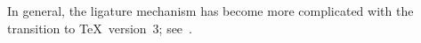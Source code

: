 In general, the ligature mechanism has become more complicated
with the transition to \TeX\ version~3; see~\cite{K:TeX23}.

\endofchapter
